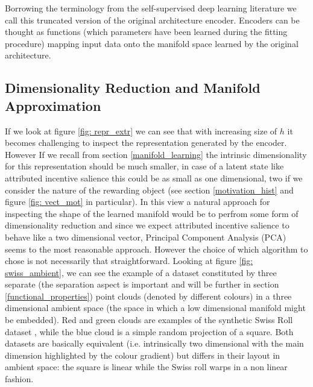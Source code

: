 Borrowing the terminology from the self-supervised deep learning literature \cite{bengio2017deep} we call this truncated version of the original architecture encoder. Encoders can be thought as functions (which parameters have been learned during the fitting procedure) mapping input data onto the manifold space learned by the original architecture.

\subsection{Dimensionality Reduction and Manifold Approximation}
\label{dim_reduction}
If we look at figure \ref{fig: repr_extr} we can see that with increasing size of $h$ it becomes challenging to inspect the representation generated by the encoder. However If we recall from section \ref{manifold_learning} the intrinsic dimensionality for this representation should be much smaller, in case of a latent state like attributed incentive salience this could be as small as one dimensional, two if we consider the nature of the rewarding object (see section \ref{motivation_hist} and figure \ref{fig: vect_mot} in particular). In this view a natural approach for inspecting the shape of the learned manifold would be to perfrom some form of dimensionality reduction and since we expect attributed incentive salience to behave like a two dimensional vector, Principal Component Analysis (PCA) \cite{pearson1901liii} seems to  the most reasonable approach. However the choice of which algorithm to chose is not necessarily that straightforward. Looking at figure \ref{fig: swiss_ambient}, we can see the example of a dataset constituted by three separate (the separation aspect is important and will be further in section \ref{functional_properties}) point clouds (denoted by different colours) in a three dimensional ambient space (the space in which a low dimensional manifold might be embedded). Red and green clouds are examples of the synthetic Swiss Roll dataset \cite{scikit-learn}, while the blue cloud is a simple random projection of a square. Both datasets are basically equivalent (i.e. intrinsically two dimensional with the main dimension highlighted by the colour gradient) but differs in their layout in ambient space: the square is linear while the Swiss roll warps in a non linear fashion.
